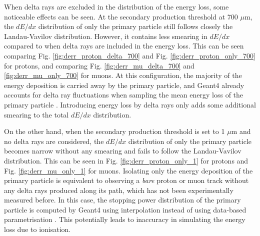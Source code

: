 When delta rays are excluded in the distribution of the energy loss, some noticeable effects can be seen. 
At the secondary production threshold at 700 $\mu$m, the $dE/dx$ distribution of only the primary particle still follows closely the Landau-Vavilov distribution.
However, it contains less smearing in $dE/dx$ compared to when delta rays are included in the energy loss.
This can be seen comparing Fig. \ref{fig:derr_proton_delta_700} and Fig. \ref{fig:derr_proton_only_700} for protons, and comparing Fig. \ref{fig:derr_mu_delta_700} and \ref{fig:derr_mu_only_700} for muons. 
At this configuration, the majority of the energy deposition is carried away by the primary particle, and Geant4 already accounts for delta ray fluctuations when sampling the mean energy loss of the 
primary particle \cite{geant4}.
Introducing energy loss by delta rays only adds some additional smearing to the total $dE/dx$ distribution.

On the other hand, when the secondary production threshold is set to 1 $\mu$m and no delta rays are considered, the $dE/dx$ distribution of only the primary particle becomes narrow without any smearing and fails to follow the Landau-Vavilov distribution.
This can be seen in Fig. \ref{fig:derr_proton_only_1} for protons and Fig. \ref{fig:derr_mu_only_1} for muons. 
Isolating only the energy deposition of the primary particle is equivalent to observing a \textit{bare} proton or muon track without any delta rays produced along its path, which has not been experimentally measured before.
In this case, the stopping power distribution of the primary particle is computed by Geant4 using interpolation instead of using data-based parametrisation \cite{geant4}.
This potentially leads to inaccuracy in simulating the energy loss due to ionisation.



